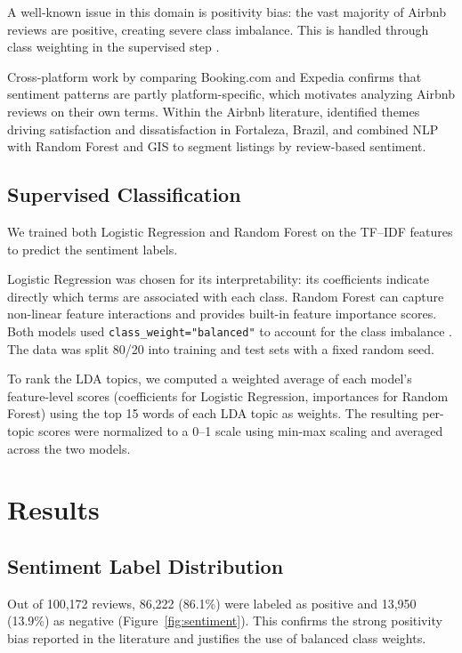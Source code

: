 \documentclass[11pt]{article}
\begin{document}
A well-known issue in this domain is positivity bias: the vast majority of Airbnb reviews are positive, creating severe class imbalance. This is handled through class weighting in the supervised step \citep{he2009learning}.

Cross-platform work by \citet{kaya2024analysing} comparing Booking.com and Expedia confirms that sentiment patterns are partly platform-specific, which motivates analyzing Airbnb reviews on their own terms. Within the Airbnb literature, \citet{santos2022expressing} identified themes driving satisfaction and dissatisfaction in Fortaleza, Brazil, and \citet{agarwal2024investigating} combined NLP with Random Forest and GIS to segment listings by review-based sentiment.

\subsection{Supervised Classification}
We trained both Logistic Regression and Random Forest on the TF--IDF features to predict the sentiment labels.

Logistic Regression \citep{pang2002thumbs, jurafsky2023speech} was chosen for its interpretability: its coefficients indicate directly which terms are associated with each class. Random Forest \citep{breiman2001random} can capture non-linear feature interactions and provides built-in feature importance scores. Both models used \texttt{class\_weight="balanced"} to account for the class imbalance \citep{he2009learning}. The data was split 80/20 into training and test sets with a fixed random seed.

To rank the LDA topics, we computed a weighted average of each model's feature-level scores (coefficients for Logistic Regression, importances for Random Forest) using the top 15 words of each LDA topic as weights. The resulting per-topic scores were normalized to a 0--1 scale using min-max scaling and averaged across the two models.

\section{Results}

\subsection{Sentiment Label Distribution}
Out of 100,172 reviews, 86,222 (86.1\%) were labeled as positive and 13,950 (13.9\%) as negative (Figure~\ref{fig:sentiment}). This confirms the strong positivity bias reported in the literature and justifies the use of balanced class weights.
\end{document}
